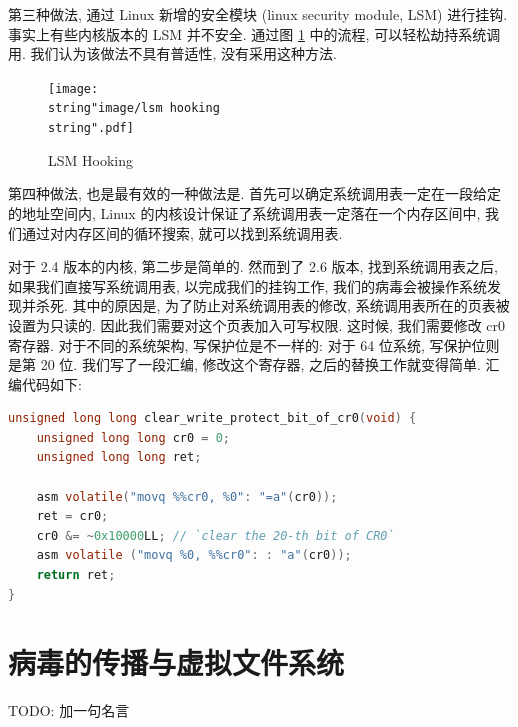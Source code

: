 \documentclass[11pt,fleqn]{book} %
\begin{document}
第三种做法, 通过 Linux 新增的安全模块 (linux security module, LSM) 进行挂钩. 事实上有些内核版本的
LSM 并不安全. 通过图 \ref{fig:LSM-Hooking} 中的流程, 可以轻松劫持系统调用. 我们认为该做法不具有普适性,
没有采用这种方法.

\begin{figure}[H]
\begin{centering}
\texttt{[image: \\string"image/lsm hooking\\string".pdf]}
\par\end{centering}

\caption{LSM Hooking\label{fig:LSM-Hooking}}


\end{figure}


第四种做法, 也是最有效的一种做法是. 首先可以确定系统调用表一定在一段给定的地址空间内, Linux 的内核设计保证了系统调用表一定落在一个内存区间中,
我们通过对内存区间的循环搜索, 就可以找到系统调用表. 

对于 2.4 版本的内核, 第二步是简单的. 然而到了 2.6 版本, 找到系统调用表之后, 如果我们直接写系统调用表, 以完成我们的挂钩工作,
我们的病毒会被操作系统发现并杀死. 其中的原因是, 为了防止对系统调用表的修改, 系统调用表所在的页表被设置为只读的. 因此我们需要对这个页表加入可写权限.
这时候, 我们需要修改 cr0 寄存器. 对于不同的系统架构, 写保护位是不一样的: 对于 64 位系统, 写保护位则是第 20 位.
我们写了一段汇编, 修改这个寄存器, 之后的替换工作就变得简单. 汇编代码如下:

\vspace*{1.5cm}

\begin{lstlisting}[language=C]
unsigned long long clear_write_protect_bit_of_cr0(void) {
	unsigned long long cr0 = 0;
	unsigned long long ret;

	asm volatile("movq %%cr0, %0": "=a"(cr0));
	ret = cr0;
	cr0 &= ~0x10000LL; // `clear the 20-th bit of CR0`
	asm volatile ("movq %0, %%cr0": : "a"(cr0)); 
	return ret; 
}
\end{lstlisting}


\vspace*{0.5cm}

\newpage{}


\chapter{病毒的传播与虚拟文件系统}



TODO: 加一句名言
\end{document}
